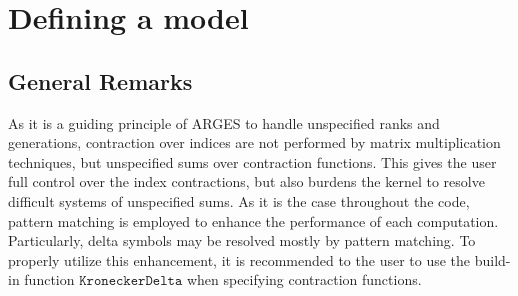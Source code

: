 \documentclass{scrartcl}
\begin{document}
\section{Defining a model}
\subsection{General Remarks}
As it is a guiding principle of ARGES to handle unspecified ranks and generations, contraction over indices are not performed by matrix multiplication techniques, but unspecified sums over contraction functions. This gives the user full control over the index contractions, but also burdens the kernel to resolve difficult systems of unspecified sums. As it is the case throughout the code, pattern matching is employed to enhance the performance of each computation. Particularly, delta symbols may be resolved mostly by pattern matching. To properly utilize this enhancement, it is recommended to the user to use the build-in function $\mathtt{KroneckerDelta}$ when specifying contraction functions. 
\end{document}
